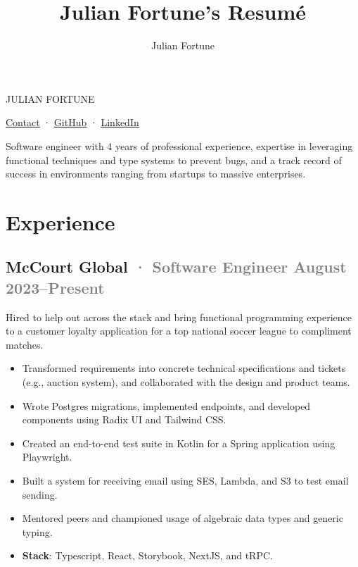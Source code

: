 \documentclass[12pt]{article} %
\title{Julian Fortune's Resumé}
\author{Julian Fortune}
\providecommand{\tightlist}{%
  \setlength{\itemsep}{0pt}\setlength{\parskip}{0pt}}
\let\defaultref\href
\renewcommand{\href}[2]{%
  \defaultref{#1}{\ul{#2}}%
}
\newcommand{\link}[2]{\href{#1}{#2}}
\renewcommand{\emph}[1]{%
  \textcolor{gray}{#1}%
}
\def\separator{ · {}}
\begin{document}
\begin{bfseries}\begin{huge}
  {\selectfont%
    \MakeTextUppercase{Julian Fortune}
  }
\end{huge}\end{bfseries}

  \link{https://julianfortune.com}{Contact}\separator%
    \link{http://github.com/julianfortune}{GitHub}\separator%
\link{http://linkedin.com/in/julianfortune}{LinkedIn}%


\vspace{0.5em}

Software engineer with 4 years of professional experience, expertise in
leveraging functional techniques and type systems to prevent bugs, and a
track record of success in environments ranging from startups to massive
enterprises.

\hypertarget{experience}{%
\section{Experience}\label{experience}}

\hypertarget{mccourt-global-software-engineer-august-2023present}{%
\subsection{\texorpdfstring{McCourt Global \emph{· \small Software
Engineer \hfill August
2023--Present}}{McCourt Global · Software Engineer August 2023--Present}}\label{mccourt-global-software-engineer-august-2023present}}

Hired to help out across the stack and bring functional programming
experience to a customer loyalty application for a top national soccer
league to compliment matches.

\begin{itemize}
\tightlist
\item
  Transformed requirements into concrete technical specifications and
  tickets (e.g., auction system), and collaborated with the design and
  product teams.
\item
  Wrote Postgres migrations, implemented endpoints, and developed
  components using Radix UI and Tailwind CSS.
\item
  Created an end-to-end test suite in Kotlin for a Spring application
  using Playwright.
\item
  Built a system for receiving email using SES, Lambda, and S3 to test
  email sending.
\item
  Mentored peers and championed usage of algebraic data types and
  generic typing.
\item
  \textbf{Stack}: Typescript, React, Storybook, NextJS, and tRPC.
\end{itemize}
\end{document}
